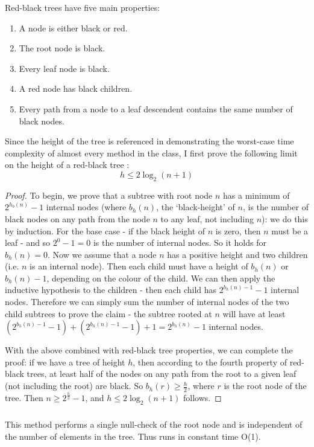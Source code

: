 Red-black trees have five main properties:
\begin{enumerate}
\item A node is either black or red.
\item The root node is black.
\item Every leaf node is black.
\item A red node has black children.
\item Every path from a node to a leaf descendent contains the same number of black nodes.
\end{enumerate}

Since the height of the tree is referenced in demonstrating the worst-case time complexity of almost every method in the class, I first prove the following limit on the height of a red-black tree \cite{clrs}:
\begin{equation*}
h \leq 2\log_2(n+1)
\end{equation*}
\begin{proof}
To begin, we prove that a subtree with root node $n$ has a minimum of $2^{h_b(n)} - 1$ internal nodes (where $b_h(n)$, the `black-height' of $n$, is the number of black nodes on any path from the node $n$ to any leaf, not including $n$): we do this by induction. For the base case - if the black height of $n$ is zero, then $n$ must be a leaf - and so $2^0 - 1 = 0$ is the number of internal nodes. So it holds for $b_h(n) = 0$. Now we assume that a node $n$ has a positive height and two children (i.e. $n$ is an internal node). Then each child must have a height of $b_h(n)$ or $b_h(n) - 1$, depending on the colour of the child. We can then apply the inductive hypothesis to the children - then each child has $2^{b_h(n) - 1} - 1$ internal nodes. Therefore we can simply sum the number of internal nodes of the two child subtrees to prove the claim - the subtree rooted at $n$ will have at least $(2^{b_h(n) - 1} - 1) + (2^{b_h(n) - 1} - 1) + 1 = 2^{b_h(n)} - 1$ internal nodes.

With the above combined with red-black tree properties, we can complete the proof: if we have a tree of height $h$, then according to the fourth property of red-black trees, at least half of the nodes on any path from the root to a given leaf (not including the root) are black. So $b_h(r) \geq \frac{h}{2}$, where $r$ is the root node of the tree. Then $n \geq 2^{\frac h 2} - 1$, and $h \leq 2\log_2(n + 1)$ follows.
\end{proof}

\subsubsection{}
This method performs a single null-check of the root node and is independent of the number of elements in the tree. Thus  runs in constant time O(1).

